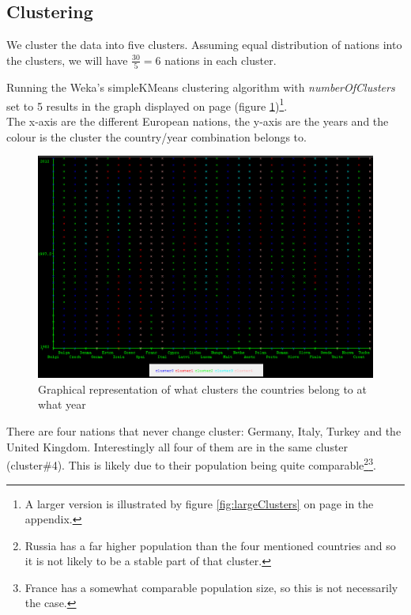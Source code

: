 \subsection{Clustering}
\label{Res_Clu}
We cluster the data into five clusters. Assuming equal distribution of nations into the clusters, we will have \begin{math}\frac{30}{5} = 6\end{math} nations in each cluster.

Running the Weka's simpleKMeans clustering algorithm with \textit{numberOfClusters} set to 5 results in the graph displayed on page \pageref{fig:clusters} (figure \ref{fig:clusters})\footnote{A larger version is illustrated by figure \ref{fig:largeClusters} on page \pageref{fig:largeClusters} in the appendix.}.
\\The x-axis are the different European nations, the y-axis are the years and the colour is the cluster the country/year combination belongs to.

\begin{figure}[h!]
  \centering
\includegraphics[width=\textwidth]{Appendix/Images/kMeans}
\caption{Graphical representation of what clusters the countries belong to at what year}
\label{fig:clusters}
\end{figure}

There are four nations that never change cluster: Germany, Italy, Turkey and the United Kingdom. Interestingly all four of them are in the same cluster (cluster\#4). This is likely due to their population being quite comparable\footnote{Russia has a far higher population than the four mentioned countries and so it is not likely to be a stable part of that cluster.}\footnote{France has a somewhat comparable population size, so this is not necessarily the case.}.

